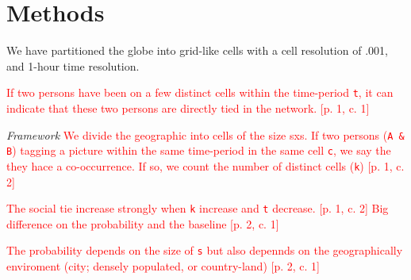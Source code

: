 \section{Methods}
We have partitioned the globe into grid-like cells with a cell resolution of .001\degree, and 1-hour time resolution. 

\textcolor{red}{If two persons have been on a few distinct cells within the time-period \texttt{t}, it can indicate that these two persons are directly tied in the network. [p. 1, c. 1]}

\textit{Framework}
\textcolor{red}{We divide the geographic into cells of the size sxs. 
If two persons (\texttt{A \& B}) tagging a picture within the same time-period in the same cell \texttt{c}, we say the they hace a co-occurrence. If so, we count the number of distinct cells (\texttt{k}) [p. 1, c. 2]}


\textcolor{red}{The social tie increase strongly when \texttt{k} increase and \texttt{t} decrease. [p. 1, c. 2]
Big difference on the probability and the baseline [p. 2, c. 1]}

\textcolor{red}{The probability depends on the size of \texttt{s} but also depennds on the geographically enviroment (city; densely populated, or country-land) [p. 2, c. 1]}